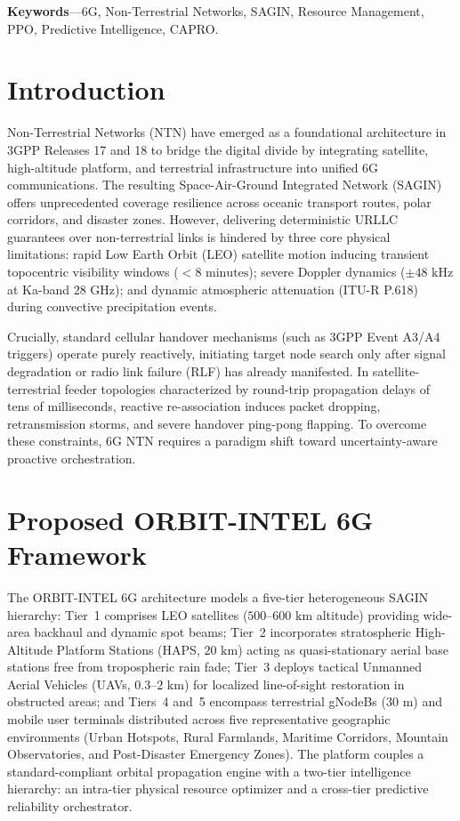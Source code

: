 \documentclass[a4paper]{article}
\begin{document}
\vspace{0.5pt}
\noindent\textbf{\fontsize{8.2}{10.1}\selectfont Keywords}---{\fontsize{8.2}{10.1}\selectfont 6G, Non-Terrestrial Networks, SAGIN, Resource Management, PPO, Predictive Intelligence, CAPRO.}

\section{Introduction}
Non-Terrestrial Networks (NTN) have emerged as a foundational architecture in 3GPP Releases 17 and 18 to bridge the digital divide by integrating satellite, high-altitude platform, and terrestrial infrastructure into unified 6G communications. The resulting Space-Air-Ground Integrated Network (SAGIN) offers unprecedented coverage resilience across oceanic transport routes, polar corridors, and disaster zones. However, delivering deterministic URLLC guarantees over non-terrestrial links is hindered by three core physical limitations: rapid Low Earth Orbit (LEO) satellite motion inducing transient topocentric visibility windows ($<8\text{ minutes}$); severe Doppler dynamics ($\pm 48\text{ kHz}$ at Ka-band $28\text{ GHz}$); and dynamic atmospheric attenuation (ITU-R P.618) during convective precipitation events.

Crucially, standard cellular handover mechanisms (such as 3GPP Event A3/A4 triggers) operate purely reactively, initiating target node search only after signal degradation or radio link failure (RLF) has already manifested. In satellite-terrestrial feeder topologies characterized by round-trip propagation delays of tens of milliseconds, reactive re-association induces packet dropping, retransmission storms, and severe handover ping-pong flapping. To overcome these constraints, 6G NTN requires a paradigm shift toward uncertainty-aware proactive orchestration.

\section{Proposed ORBIT-INTEL 6G Framework}
The ORBIT-INTEL 6G architecture models a five-tier heterogeneous SAGIN hierarchy: Tier~1 comprises LEO satellites ($500\text{--}600\text{ km}$ altitude) providing wide-area backhaul and dynamic spot beams; Tier~2 incorporates stratospheric High-Altitude Platform Stations (HAPS, $20\text{ km}$) acting as quasi-stationary aerial base stations free from tropospheric rain fade; Tier~3 deploys tactical Unmanned Aerial Vehicles (UAVs, $0.3\text{--}2\text{ km}$) for localized line-of-sight restoration in obstructed areas; and Tiers~4 and~5 encompass terrestrial gNodeBs ($30\text{ m}$) and mobile user terminals distributed across five representative geographic environments (Urban Hotspots, Rural Farmlands, Maritime Corridors, Mountain Observatories, and Post-Disaster Emergency Zones). The platform couples a standard-compliant orbital propagation engine with a two-tier intelligence hierarchy: an intra-tier physical resource optimizer and a cross-tier predictive reliability orchestrator.
\end{document}
